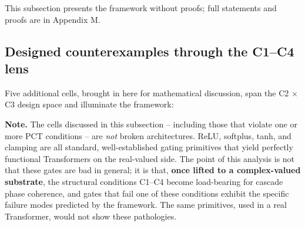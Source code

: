 \documentclass[11pt,a4paper]{article}
\theoremstyle{plain}
\theoremstyle{definition}
\begin{document}
This subsection presents the framework without proofs; full statements and proofs are in Appendix M.

\subsection{Designed counterexamples through the C1--C4 lens}
Five additional cells, brought in here for mathematical discussion, span the C2 $\times$ C3 design space and illuminate the framework:

\noindent
\begin{minipage}[t]{0.64\textwidth}
\vspace{0pt}
\textbf{Note.} The cells discussed in this subsection -- including those that violate one or more PCT conditions -- are \emph{not} broken architectures. ReLU, softplus, tanh, and clamping are all standard, well-established gating primitives that yield perfectly functional Transformers on the real-valued side. The point of this analysis is not that these gates are bad in general; it is that, \textbf{once lifted to a complex-valued substrate}, the structural conditions C1--C4 become load-bearing for cascade phase coherence, and gates that fail one of these conditions exhibit the specific failure modes predicted by the framework. The same primitives, used in a real Transformer, would not show these pathologies.
\end{minipage}\hfill
\begin{minipage}[t]{0.28\textwidth}
\vspace{0pt}
\centering
{\small
\setlength{\tabcolsep}{3.5pt}
\renewcommand{\arraystretch}{1.1}
}
\captionsetup{skip=2pt,justification=centering}
\end{minipage}
\par\medskip
\end{document}
